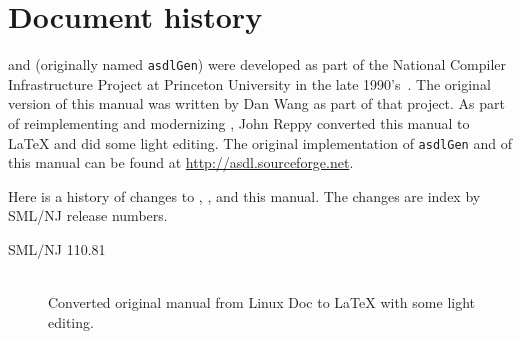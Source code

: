 %
\chapter{Document history}
\label{ch:history}

\asdl{} and \asdlgen{} (originally named \texttt{asdlGen}) were developed as part
of the National Compiler Infrastructure Project at Princeton University in the
late 1990's~\cite{usenix:zephyr-asdl}.
The original version of this manual was written by Dan Wang as part of that project.
As part of reimplementing and modernizing \asdl{}, John Reppy converted this manual
to \LaTeX{} and did some light editing.
The original implementation of \texttt{asdlGen} and of this manual can be
found at \url{http://asdl.sourceforge.net}.

Here is a history of changes to \asdl{}, \asdlgen{}, and this manual.
The changes are index by SML/NJ release numbers.

\begin{description}
  \item[SML/NJ 110.81]
    \mbox{}\\[0.5em]
    Converted original manual from Linux Doc to \LaTeX{} with some light editing.
\end{description}%
